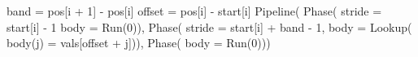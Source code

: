 \begin{juliacode}
band = pos[i + 1] - pos[i]
offset = pos[i] - start[i]
Pipeline(
  Phase(
    stride = start[i] - 1
    body = Run(0)),
  Phase(
    stride = start[i] + band - 1,
    body = Lookup(
      body(j) = vals[offset + j])),
  Phase(
    body = Run(0)))
\end{juliacode}